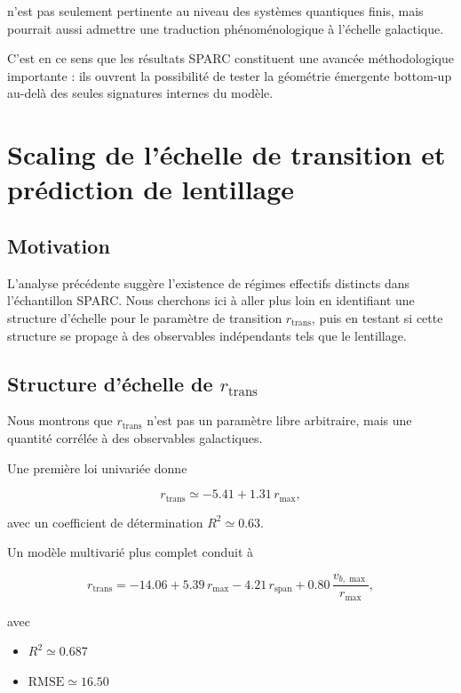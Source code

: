 \documentclass[11pt]{article}
\begin{document}
n'est pas seulement pertinente au niveau des systèmes quantiques finis, mais pourrait aussi admettre une traduction phénoménologique à l'échelle galactique.

C'est en ce sens que les résultats SPARC constituent une avancée méthodologique importante : ils ouvrent la possibilité de tester la géométrie émergente bottom-up au-delà des seules signatures internes du modèle.


\section{Scaling de l'échelle de transition et prédiction de lentillage}

\subsection{Motivation}

L'analyse précédente suggère l'existence de régimes effectifs distincts dans l'échantillon SPARC. Nous cherchons ici à aller plus loin en identifiant une structure d'échelle pour le paramètre de transition $r_{\mathrm{trans}}$, puis en testant si cette structure se propage à des observables indépendants tels que le lentillage.

\subsection{Structure d'échelle de $r_{\mathrm{trans}}$}

Nous montrons que $r_{\mathrm{trans}}$ n'est pas un paramètre libre arbitraire, mais une quantité corrélée à des observables galactiques.

Une première loi univariée donne

\[
r_{\mathrm{trans}} \simeq -5.41 + 1.31\,r_{\max},
\]

avec un coefficient de détermination $R^2 \simeq 0.63$.

Un modèle multivarié plus complet conduit à

\[
r_{\mathrm{trans}}
=
-14.06 + 5.39\,r_{\max}
- 4.21\,r_{\mathrm{span}}
+ 0.80\,\frac{v_{b,\max}}{r_{\max}},
\]

avec

\begin{itemize}
\item $R^2 \simeq 0.687$
\item $\mathrm{RMSE} \simeq 16.50$
\end{itemize}
\end{document}
